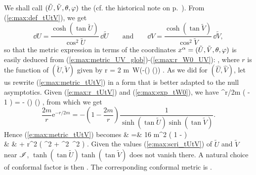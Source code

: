 We shall call $(\tilde{U},\tilde{V},\theta,\varphi)$ the
(cf. the historical note on p.~\pageref{h:max:PFN_coord}).
From (\ref{e:max:def_tUtV}), we get
\[
    \dd U = \frac{\cosh(\tan\tilde{U})}{\cos^2\tilde{U}}\, \dd\tilde{U}
    \qquad\mbox{and}\qquad
    \dd V = \frac{\cosh(\tan\tilde{V})}{\cos^2\tilde{V}}\, \dd\tilde{V} ,
\]
so that the metric expression in terms of the coordinates
$x^\alpha=(\tilde{U},\tilde{V},\theta,\varphi)$ is easily deduced from
(\ref{e:max:metric_UV_glob})-(\ref{e:max:r_W0_UV}):
\be \label{e:max:metric_tUtV}
    ,
\ee
where $r$ is the function of $(\tilde{U},\tilde{V})$ given by
\be \label{e:max:r_tUtV}
    r = 2 m\,  W\!\left(-\sinh(\tan {}) \sinh(\tan {})\right) .
\ee
As we did for $(\hat{U},\hat{V})$, let us rewrite (\ref{e:max:metric_tUtV}) in
a form that is better adapted to the null asymptotics.
Given (\ref{e:max:r_tUtV}) and (\ref{e:max:exp_tW0}), we have
\be \label{e:max:exp_r_tUtV}
    ^{r/2m} \left(  - 1 \right) =
        - \sinh(\tan {}) \sinh(\tan {}) ,
\ee
from which we get
\[
    \frac{2m}{r} \mathrm{e}^{-r/2m} = - \left( 1 - \frac{2m}{r} \right)
        \frac{1}{\sinh(\tan \tilde{U}) \sinh(\tan \tilde{V})} .
\]
Hence (\ref{e:max:metric_tUtV}) becomes
\bea
     & =&
    16 m^2 \left( 1 -  \right)
     \nonumber\\
    & &
     +  r^2 \left( \dd\th^2 + \sin^2\th\, \dd\ph^2 \right) .
\eea
Given the values (\ref{e:max:scri_tUtV}) of $\tilde{U}$ and $\tilde{V}$ near
$\mathscr{I}$, $\tanh(\tan\tilde{U}) \tanh(\tan\tilde{V})$ does not vanish there.
A natural choice of conformal factor is then
\be \label{e:max:def_Omega_tUtV}
   .
\ee
The corresponding conformal metric is
\be \label{e:max:conf_metric_tUtV}
     .
